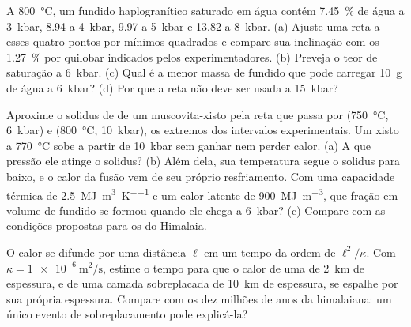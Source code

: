 \begin{exercise}[$\star\star$]\label{exo:b2:crustal-melting:9}
A \qty{800}{\celsius}, um fundido haplogranítico saturado em água contém \qty{7.45}{\percent}
de água a \qty{3}{kbar}, 8.94 a \qty{4}{kbar}, 9.97 a \qty{5}{kbar} e 13.82 a
\qty{8}{kbar}. (a) Ajuste uma reta a esses quatro pontos por mínimos quadrados e compare
sua inclinação com os \qty{1.27}{\percent} por quilobar indicados pelos experimentadores.
(b) Preveja o teor de saturação a \qty{6}{kbar}. (c) Qual é a menor massa de fundido
que pode carregar \qty{10}{\gram} de água a \qty{6}{kbar}? (d) Por que a reta não deve ser
usada a \qty{15}{kbar}?
\end{exercise}

\begin{exercise}[$\star\star\star$]\label{exo:b2:crustal-melting:10}
Aproxime o solidus de  de um muscovita-xisto pela reta que passa
por (\qty{750}{\celsius}, \qty{6}{kbar}) e (\qty{800}{\celsius}, \qty{10}{kbar}),
os extremos dos intervalos experimentais. Um xisto a \qty{770}{\celsius} sobe a partir de
\qty{10}{kbar} sem ganhar nem perder calor. (a) A que pressão ele atinge o
solidus? (b) Além dela, sua temperatura segue o solidus para baixo, e o calor da fusão vem
de seu próprio resfriamento. Com uma capacidade térmica de \qty{2.5}{\mega\joule\per\cubic\metre\per\kelvin}
e um calor latente de \qty{900}{\mega\joule\per\cubic\metre}, que fração em volume de fundido
se formou quando ele chega a \qty{6}{kbar}? (c) Compare com as condições propostas para os
 do Himalaia.
\end{exercise}

\begin{exercise}[$\star\star\star$]\label{exo:b2:crustal-melting:11}
O calor se difunde por uma distância $\ell$ em um tempo da ordem de $\ell^2/\kappa$. Com
$\kappa = \qty{1e-6}{\square\metre\per\second}$, estime o tempo para que o calor de uma
 de \qty{2}{km} de espessura, e de uma camada sobreplacada de \qty{10}{km} de espessura, se espalhe por sua
própria espessura. Compare com os dez milhões de anos da  himalaiana: um único
evento de sobreplacamento pode explicá-la?
\end{exercise}

